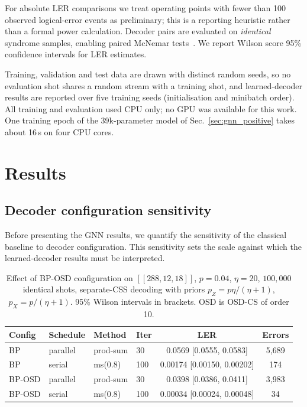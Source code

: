 \documentclass[a4paper,twocolumn,11pt,nopdfoutputerror]{quantumarticle}
\newcommand{\code}[3]{\ensuremath{[\![#1,#2,#3]\!]}}
\begin{document}
For absolute LER comparisons we treat operating points with fewer than
100 observed logical-error events as preliminary; this is a reporting
heuristic rather than a formal power calculation. Decoder pairs are
evaluated on \emph{identical} syndrome samples, enabling paired
McNemar tests~\cite{McNemar1947}. We report Wilson score 95\% confidence
intervals for LER estimates.

Training, validation and test data are drawn with distinct random seeds,
so no evaluation shot shares a random stream with a training shot, and
learned-decoder results are reported over five training seeds
(initialisation and minibatch order). All training and evaluation used CPU
only; no GPU was available for this work. One training epoch of the
39k-parameter model of Sec.~\ref{sec:gnn_positive} takes about 16\,s on
four CPU cores.

\section{Results}\label{sec:results}

\subsection{Decoder configuration sensitivity}\label{sec:baseline}

Before presenting the GNN results, we quantify the sensitivity of the
classical baseline to decoder configuration. This sensitivity sets the
scale against which the learned-decoder results must be interpreted.

\begin{table}[t]
\centering
\caption{Effect of BP-OSD configuration on $\code{288}{12}{18}$, $p=0.04$,
         $\eta=20$, $100{,}000$ identical shots, separate-CSS decoding with
         priors $p_Z=p\eta/(\eta+1)$, $p_X=p/(\eta+1)$. 95\% Wilson intervals
         in brackets. OSD is OSD-CS of order 10.}
\label{tab:smoking_gun}
\begin{tabular}{@{}llllcc@{}}
\toprule
Config & Schedule & Method & Iter & LER & Errors \\
\midrule
BP              & parallel & prod-sum & 30  & 0.0569 [0.0555, 0.0583] & 5{,}689 \\
BP              & serial   & ms(0.8)  & 100 & 0.00174 [0.00150, 0.00202] & 174 \\
BP-OSD          & parallel & prod-sum & 30  & 0.0398 [0.0386, 0.0411] & 3{,}983 \\
BP-OSD          & serial   & ms(0.8)  & 100 & 0.00034 [0.00024, 0.00048] & 34 \\
\bottomrule
\end{tabular}
\end{table}
\end{document}
